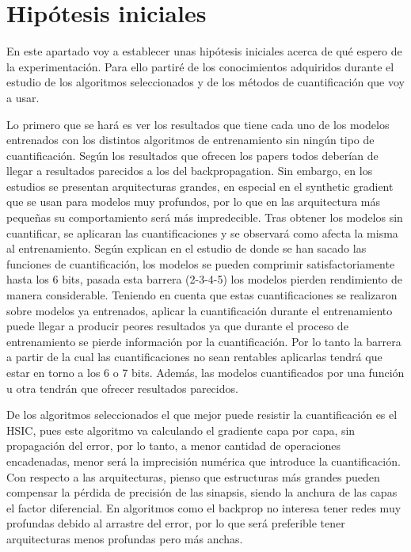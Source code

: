 \section{Hipótesis iniciales}

En este apartado voy a establecer unas hipótesis iniciales acerca de qué espero de la experimentación. Para ello partiré de los conocimientos adquiridos durante el estudio de los algoritmos seleccionados y de los métodos de cuantificación que voy a usar. 

Lo primero que se hará es ver los resultados que tiene cada uno de los modelos entrenados con los distintos algoritmos de entrenamiento sin ningún tipo de cuantificación. Según los resultados que ofrecen los papers todos deberían de llegar a resultados parecidos a los del backpropagation. Sin embargo, en los estudios se presentan arquitecturas grandes, en especial en el synthetic gradient que se usan para modelos muy profundos, por lo que en las arquitectura más pequeñas su comportamiento será más impredecible. Tras obtener los modelos sin cuantificar, se aplicaran las cuantificaciones y se observará como afecta la misma al entrenamiento. Según explican en el estudio de donde se han sacado las funciones de cuantificación, los modelos se pueden comprimir satisfactoriamente hasta los 6 bits, pasada esta barrera (2-3-4-5) los modelos pierden rendimiento de manera considerable. Teniendo en cuenta que estas cuantificaciones se realizaron sobre modelos ya entrenados, aplicar la cuantificación durante el entrenamiento puede llegar a producir peores resultados ya que durante el proceso de entrenamiento se pierde información por la cuantificación. Por lo tanto la barrera a partir de la cual las cuantificaciones no sean rentables aplicarlas tendrá que estar en torno a los 6 o 7 bits. Además, las modelos cuantificados por una función u otra tendrán que ofrecer resultados parecidos. 

De los algoritmos seleccionados el que mejor puede resistir la cuantificación es el HSIC, pues este algoritmo va calculando el gradiente capa por capa, sin propagación del error, por lo tanto, a menor cantidad de operaciones encadenadas, menor será la imprecisión numérica que introduce la cuantificación. Con respecto a las arquitecturas, pienso que estructuras más grandes pueden compensar la pérdida de precisión de las sinapsis, siendo la anchura de las capas el factor diferencial. En algoritmos como el backprop no interesa tener redes muy profundas debido al arrastre del error, por lo que será preferible tener arquitecturas menos profundas pero más anchas. 